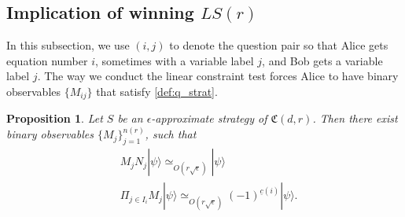 \documentclass[11pt,letterpaper]{article}
\newcommand{\ket}[1]{|#1\rangle}
\newcommand{\1}{\mathbb{1}}
\newcommand{\LS}{LS}
\newcommand{\nr}{n(r)}
\newcommand{\uc}{\underline{c}}
\newcommand{\fC}{\mathfrak{C}}
\newcommand{\ep}{\epsilon}
\newcommand{\se}{\sqrt{\epsilon}}
\newcommand{\appd}[1]{\simeq_{#1}}
\newtheorem{proposition}[theorem]{Proposition}
\theoremstyle{definition}
\begin{document}
\subsection{Implication of winning $\LS(r)$}
\label{sec:imp_lct}
In this subsection, we use $(i,j)$ to denote the question pair so that Alice gets equation number $i$, 
sometimes with a variable label $j$, and Bob gets a variable label $j$.
The way we conduct the linear constraint test forces Alice to have binary observables $\{M_{ij}\}$ that satisfy 
\cref{def:q_strat}.
\begin{proposition}
	\label{prop:lct_base}
	Let $S$ be an $\ep$-approximate strategy of $\fC(d,r)$.
	Then there exist binary observables $\{ M_j \}_{j=1}^{\nr} $, such that
	\begin{align}
		&M_j N_j \ket{\psi} \appd{O(r\se)} \ket{\psi} \\
		&\Pi_{j \in I_i} M_j \ket{\psi} \appd{O(r\se)}(-1)^{\uc(i)} \ket{\psi}.
	\end{align}
\end{proposition}
\end{document}
